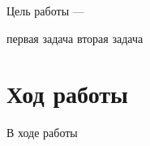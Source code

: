 \documentclass[a4paper,14pt]{extarticle}
\begin{document}
\maketitle
\guaptoc

\guapintro

Цель работы —

\guaptasks
первая задача
вторая задача

\section{Ход работы}



\guapconclusion

В ходе работы
\end{document}
